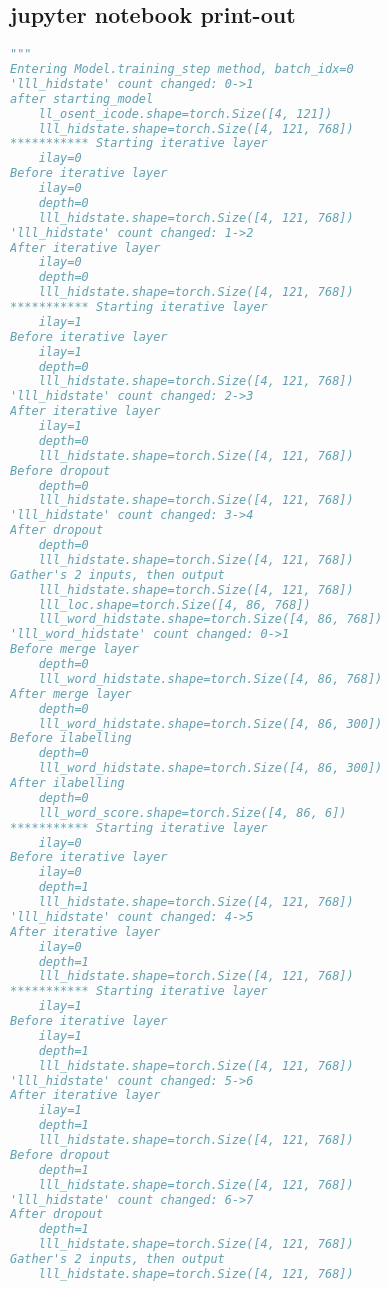 \documentclass[12pt]{article}
\begin{document}
\subsection{jupyter notebook print-out}


\begin{lstlisting}[language=Python]
"""
Entering Model.training_step method, batch_idx=0
'lll_hidstate' count changed: 0->1
after starting_model
    ll_osent_icode.shape=torch.Size([4, 121])
    lll_hidstate.shape=torch.Size([4, 121, 768])
*********** Starting iterative layer
    ilay=0
Before iterative layer
    ilay=0
    depth=0
    lll_hidstate.shape=torch.Size([4, 121, 768])
'lll_hidstate' count changed: 1->2
After iterative layer
    ilay=0
    depth=0
    lll_hidstate.shape=torch.Size([4, 121, 768])
*********** Starting iterative layer
    ilay=1
Before iterative layer
    ilay=1
    depth=0
    lll_hidstate.shape=torch.Size([4, 121, 768])
'lll_hidstate' count changed: 2->3
After iterative layer
    ilay=1
    depth=0
    lll_hidstate.shape=torch.Size([4, 121, 768])
Before dropout
    depth=0
    lll_hidstate.shape=torch.Size([4, 121, 768])
'lll_hidstate' count changed: 3->4
After dropout
    depth=0
    lll_hidstate.shape=torch.Size([4, 121, 768])
Gather's 2 inputs, then output
    lll_hidstate.shape=torch.Size([4, 121, 768])
    lll_loc.shape=torch.Size([4, 86, 768])
    lll_word_hidstate.shape=torch.Size([4, 86, 768])
'lll_word_hidstate' count changed: 0->1
Before merge layer
    depth=0
    lll_word_hidstate.shape=torch.Size([4, 86, 768])
After merge layer
    depth=0
    lll_word_hidstate.shape=torch.Size([4, 86, 300])
Before ilabelling
    depth=0
    lll_word_hidstate.shape=torch.Size([4, 86, 300])
After ilabelling
    depth=0
    lll_word_score.shape=torch.Size([4, 86, 6])
*********** Starting iterative layer
    ilay=0
Before iterative layer
    ilay=0
    depth=1
    lll_hidstate.shape=torch.Size([4, 121, 768])
'lll_hidstate' count changed: 4->5
After iterative layer
    ilay=0
    depth=1
    lll_hidstate.shape=torch.Size([4, 121, 768])
*********** Starting iterative layer
    ilay=1
Before iterative layer
    ilay=1
    depth=1
    lll_hidstate.shape=torch.Size([4, 121, 768])
'lll_hidstate' count changed: 5->6
After iterative layer
    ilay=1
    depth=1
    lll_hidstate.shape=torch.Size([4, 121, 768])
Before dropout
    depth=1
    lll_hidstate.shape=torch.Size([4, 121, 768])
'lll_hidstate' count changed: 6->7
After dropout
    depth=1
    lll_hidstate.shape=torch.Size([4, 121, 768])
Gather's 2 inputs, then output
    lll_hidstate.shape=torch.Size([4, 121, 768])

\end{lstlisting}
\end{document}
